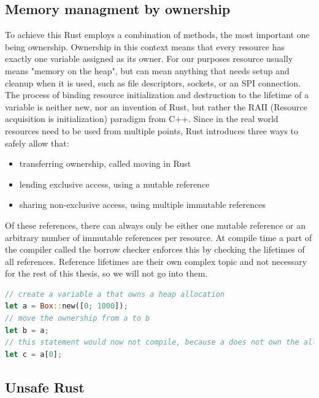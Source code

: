 \subsection{Memory managment by ownership}
\label{sec:background:rust:ownership}

To achieve this Rust employs a combination of methods, the most important one being ownership.
Ownership in this context means that every resource has exactly one variable assigned as its owner.
For our purposes resource usually means "memory on the heap",
but can mean anything that needs setup and cleanup when it is used,
such as file descriptors, sockets, or an SPI connection.
The process of binding resource initialization and destruction to the lifetime of a variable is neither new,
nor an invention of Rust,
but rather the RAII (Resource acquisition is initialization) paradigm from C++.
Since in the real world resources need to be used from multiple points, Rust introduces three ways to safely allow that:
\begin{itemize}
    \item transferring ownership, called moving in Rust
    \item lending exclusive access, using a mutable reference
    \item sharing non-exclusive access, using multiple immutable references
\end{itemize}

Of these references, there can always only be either one mutable reference or an arbitrary number of immutable references per resource.
At compile time a part of the compiler called the borrow checker enforces this by checking the lifetimes of all references.
Reference lifetimes are their own complex topic and not necessary for the rest of this thesis, so we will not go into them.

\begin{lstlisting}[language=Rust,style=colouredRust]
// create a variable a that owns a heap allocation
let a = Box::new([0; 1000]);
// move the ownership from a to b
let b = a;
// this statement would now not compile, because a does not own the allocation anymore
let c = a[0];
\end{lstlisting}

\subsection{Unsafe Rust}
\label{sec:background:rust:unsafe}

